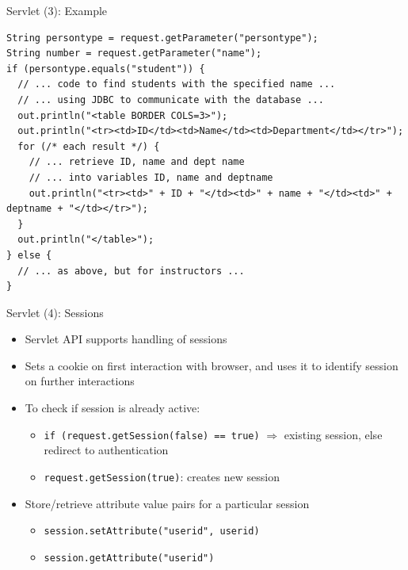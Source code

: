 \documentclass[aspectratio=169, xcolor=dvipsnames]{beamer}
\begin{document}
\begin{frame}[fragile]{Servlet (3): Example}
    \begin{verbatim}
String persontype = request.getParameter("persontype");
String number = request.getParameter("name");
if (persontype.equals("student")) {
  // ... code to find students with the specified name ...
  // ... using JDBC to communicate with the database ...
  out.println("<table BORDER COLS=3>");
  out.println("<tr><td>ID</td><td>Name</td><td>Department</td></tr>");
  for (/* each result */) {
    // ... retrieve ID, name and dept name
    // ... into variables ID, name and deptname
    out.println("<tr><td>" + ID + "</td><td>" + name + "</td><td>" + deptname + "</td></tr>");
  }
  out.println("</table>");
} else {
  // ... as above, but for instructors ...
}
    \end{verbatim}
\end{frame}

\begin{frame}{Servlet (4): Sessions}
    \begin{itemize}[<+->]
        \item Servlet API supports handling of sessions
        \item Sets a cookie on first interaction with browser, and uses it to identify session on further interactions
        \item To check if session is already active:
        \begin{itemize}
            \item[$\triangleright$] \texttt{if (request.getSession(false) == true)} $\Rightarrow$ existing session, else redirect to authentication
            \item[$\triangleright$] \texttt{request.getSession(true)}: creates new session
        \end{itemize}
        \item Store/retrieve attribute value pairs for a particular session
        \begin{itemize}
            \item[$\triangleright$] \texttt{session.setAttribute("userid", userid)}
            \item[$\triangleright$] \texttt{session.getAttribute("userid")}
        \end{itemize}
    \end{itemize}
\end{frame}
\end{document}
